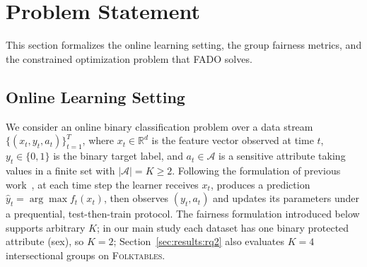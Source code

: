 \documentclass[conference]{IEEEtran}
\newcommand{\fado}{\textsc{FADO}}
\newcommand{\folk}{\textsc{Folktables}}
\newcommand{\rev}[1]{{\color{blue}#1}}
\renewcommand{\rev}[1]{#1}
\begin{document}
\section{Problem Statement}
\label{sec:problem}
This section formalizes the online learning setting, the group fairness metrics, and the 
constrained optimization problem that \fado{} solves.

\subsection{Online Learning Setting}
\label{sec:problem:online}
We consider an online binary classification problem over a data stream $\{(x_t, y_t, a_t)\}_{t=1}^{T}$, where $x_t \in \mathbb{R}^d$ is the feature vector
observed at time $t$, $y_t \in \{0,1\}$ is the binary target label, and $a_t \in \mathcal{A}$ is a sensitive attribute taking values in a finite set with
$|\mathcal{A}|=K \ge 2$. Following the formulation of previous work~\cite{chowdhury2024enhancing,zhang2019fahtadaptivefairnessawaredecision}, at each time step the learner receives $x_t$,
produces a prediction $\hat{y}_t = \arg\max f_t(x_t)$, then observes $(y_t, a_t)$ and updates its parameters under a prequential, test-then-train protocol. The
fairness formulation introduced below supports arbitrary $K$; in our main study each dataset has one binary protected attribute (sex), so $K=2$\rev{;
Section~\ref{sec:results:rq2} also evaluates $K=4$ intersectional groups on \folk{}}.
\end{document}
